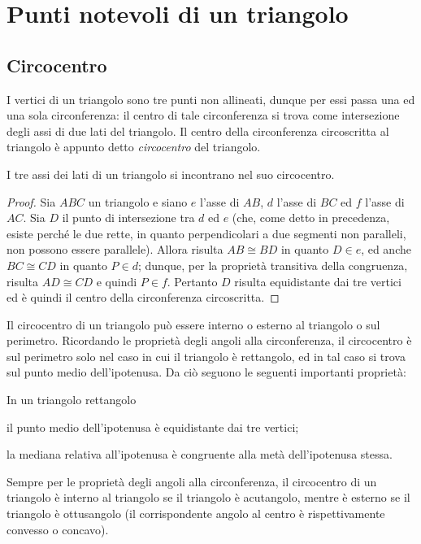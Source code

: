 \section{Punti notevoli di un triangolo}

\subsection{Circocentro}

I vertici di un triangolo sono tre punti non allineati, dunque per essi passa una ed una sola circonferenza: il centro di tale circonferenza si trova come intersezione degli assi di due lati del triangolo. Il centro della circonferenza circoscritta al triangolo è appunto detto \emph{circocentro} del triangolo.
\begin{teorema}
I tre assi dei lati di un triangolo si incontrano nel suo circocentro.
\end{teorema}

\begin{proof}
Sia $ABC$ un triangolo e siano $e$ l'asse di $AB$, $d$ l'asse di $BC$ ed $f$ l'asse di $AC$. Sia $D$ il punto di intersezione tra $d$ ed $e$ (che, come detto in precedenza, esiste perché le due rette, in quanto perpendicolari a due segmenti non paralleli, non possono essere parallele). Allora risulta $AB\cong BD$ in quanto $D\in e$, ed anche $BC\cong CD$ in quanto $P\in d$; dunque, per la proprietà transitiva della congruenza, risulta $AD\cong CD$ e quindi $P\in f$. Pertanto $D$ risulta equidistante dai tre vertici ed è quindi il centro della circonferenza circoscritta.
\end{proof}

\osservazione Il circocentro di un triangolo può essere interno o esterno al triangolo o sul perimetro. Ricordando le proprietà degli angoli alla circonferenza, il circocentro è sul perimetro solo nel caso in cui il triangolo è rettangolo, ed in tal caso si trova sul punto medio dell'ipotenusa.
Da ciò seguono le seguenti importanti proprietà:
\begin{teorema}
In un triangolo rettangolo
\begin{itemize*}
\item il punto medio dell'ipotenusa è equidistante dai tre vertici;
\item la mediana relativa all'ipotenusa è congruente alla metà dell'ipotenusa stessa.
\end{itemize*}
\end{teorema}

Sempre per le proprietà degli angoli alla circonferenza, il circocentro di un triangolo è interno al triangolo se il triangolo è acutangolo, mentre è esterno se il triangolo è ottusangolo (il corrispondente angolo al centro è rispettivamente convesso o concavo).


